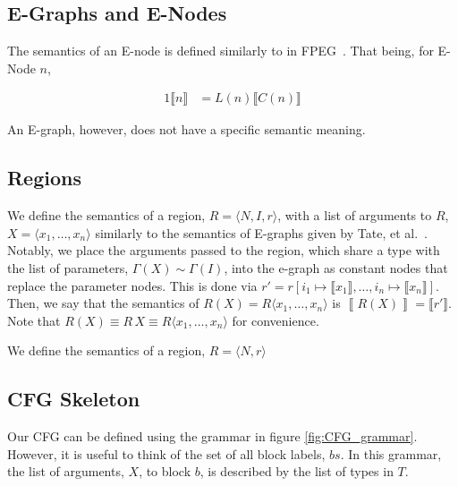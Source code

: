 \documentclass{article}
\begin{document}
\subsection{E-Graphs and E-Nodes}

The semantics of an E-node is defined similarly to in FPEG~\cite{dellaneve_2023}. That being, for E-Node $n$,

\begin{alignat*}{1}
  \llbracket n \rrbracket &= L(n) \llbracket C(n) \rrbracket
\end{alignat*}


An E-graph, however, does not have a specific semantic meaning.


\subsection{Regions}

We define the semantics of a region, $R = \langle N, I, r \rangle$, with a list of arguments to $R$, $X = \langle x_1, \dots, x_n \rangle$ similarly to the semantics of E-graphs given by Tate, et al.~\cite{eqsat-lmcs}. Notably, we place the arguments passed to the region, which share a type with the list of parameters, $\Gamma (X) \sim  \Gamma (I)$, into the e-graph as constant nodes that replace the parameter nodes. This is done via $r' = r[i_1 \mapsto \llbracket x_1 \rrbracket, \dots, i_n \mapsto \llbracket x_n \rrbracket]$. Then, we say that the semantics of $R (X) = R \langle x_1, \dots, x_n \rangle$ is $\left \llbracket R (X) \right \rrbracket = \llbracket r' \rrbracket$. Note that $R (X) \equiv R\, X \equiv R \langle x_1, \dots, x_n \rangle$ for convenience.

We define the semantics of a region, $R = \langle N, r \rangle$


\subsection{CFG Skeleton}

Our CFG can be defined using the grammar in figure \ref{fig:CFG_grammar}. However, it is useful to think of the set of all block labels, $bs$. In this grammar, the list of arguments, $X$, to block $b$, is described by the list of types in $T$.
\end{document}
